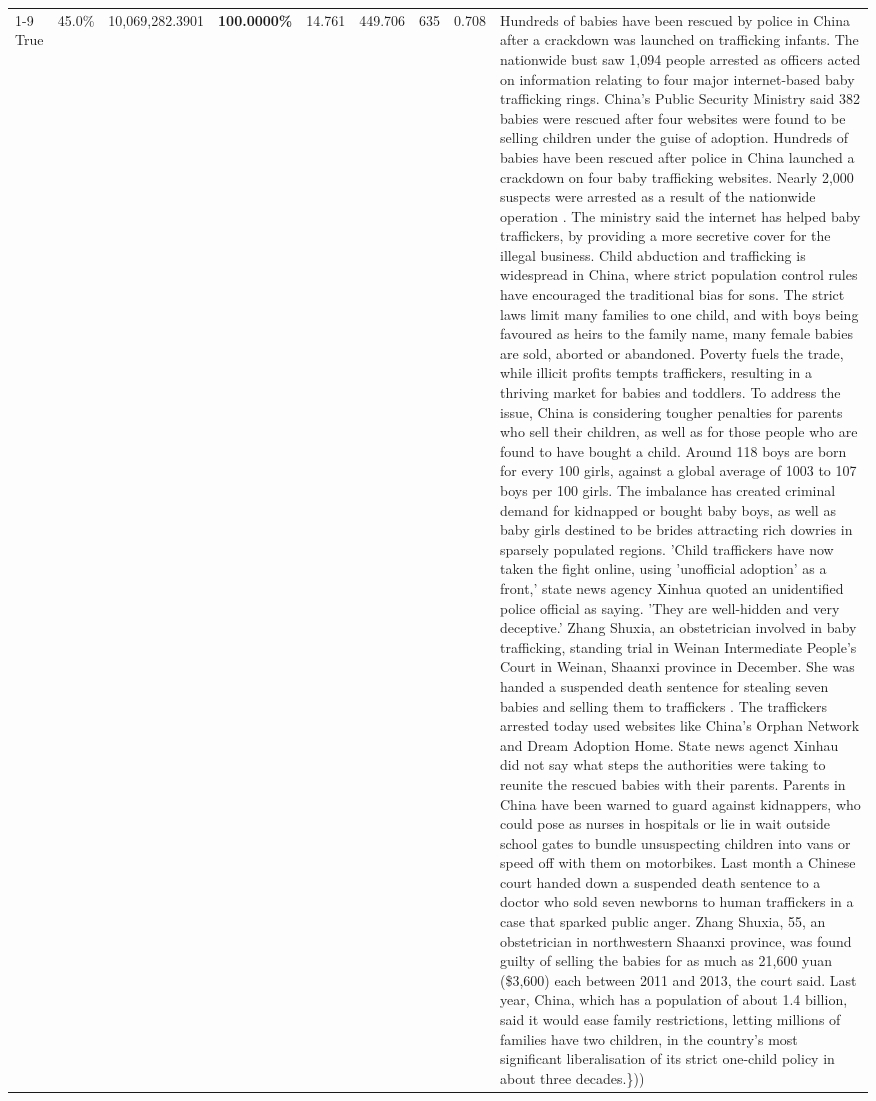 \begin{table}[H]
\begin{tabular}{lllrlllll}
\cline{1-9}
True & 45.0\% & 10,069,282.3901 & \bfseries \color{red} 100.0000\% & 14.761 & 449.706 & 635 & 0.708 & Hundreds of babies have been rescued by police in China after a crackdown was launched on trafficking infants. The nationwide bust saw 1,094 people arrested as officers acted on information relating to four major internet-based baby trafficking rings. China's Public Security Ministry said 382 babies were rescued after four websites were found to be selling children under the guise of adoption. Hundreds of babies have been rescued after police in China launched a crackdown on four baby trafficking websites. Nearly 2,000 suspects were arrested as a result of the nationwide operation . The ministry said the internet has helped baby traffickers, by providing a more secretive cover for the illegal business. Child abduction and trafficking is widespread in China, where strict population control rules have encouraged the traditional bias for sons. The strict laws limit many families to one child, and with boys being favoured as heirs to the family name, many female babies are sold, aborted or abandoned. Poverty fuels the trade, while illicit profits tempts traffickers, resulting in a thriving market for babies and toddlers. To address the issue, China is considering tougher penalties for parents who sell their children, as well as for those people who are found to have bought a child. Around 118 boys are born for every 100 girls, against a global average of 1003 to 107 boys per 100 girls. The imbalance has created criminal demand for kidnapped or bought baby boys, as well as baby girls destined to be brides attracting rich dowries in sparsely populated regions. 'Child traffickers have now taken the fight online, using 'unofficial adoption' as a front,' state news agency Xinhua quoted an unidentified police official as saying. 'They are well-hidden and very deceptive.' Zhang Shuxia, an obstetrician involved in baby trafficking, standing trial in Weinan Intermediate People's Court in Weinan, Shaanxi province in December. She was handed a suspended death sentence for stealing seven babies and selling them to traffickers . The traffickers arrested today used websites like China's Orphan Network and Dream Adoption Home. State news agenct Xinhau did not say what steps the authorities were taking to reunite the rescued babies with their parents. Parents in China have been warned to guard against kidnappers, who could pose as nurses in hospitals or lie in wait outside school gates to bundle unsuspecting children into vans or speed off with them on motorbikes. Last month a Chinese court handed down a suspended death sentence to a doctor who sold seven newborns to human traffickers in a case that sparked public anger. Zhang Shuxia, 55, an obstetrician in northwestern Shaanxi province, was found guilty of selling the babies for as much as 21,600 yuan (\$3,600) each between 2011 and 2013, the court said. Last year, China, which has a population of about 1.4 billion, said it would ease family restrictions, letting millions of families have two children, in the country's most significant liberalisation of its strict one-child policy in about three decades.\})) \\

\end{tabular}
\end{table}
